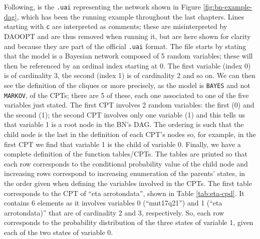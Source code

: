 Following, is the \texttt{.uai} representing the network shown in Figure \ref{fig:bn-example-dag}, which has been the running example throughout the last chapters.
Lines starting with \texttt{c} are interpreted as comments; these are misinterpreted by DAOOPT and are thus removed when running it, but are here shown for clarity and because they are part of the official \texttt{.uai} format.
The file starts by stating that the model is a Bayesian network composed of 5 random variables; these will then be referenced by an ordinal index starting at 0.
The first variable (index 0) is of cardinality 3, the second (index 1) is of cardinality 2 and so on.
We can then see the definition of the cliques or more precisely, as the model is \texttt{BAYES}  and not \texttt{MARKOV}, of the CPTs; there are 5 of these, each one associated to one of the five variables just stated.
The first CPT involves 2 random variables: the first (0) and the second (1); the second CPT involves only one variable (1) and this tells us that variable 1 is a root node in the BN's DAG.
The ordering is such that the child node is the last in the definition of each CPT's nodes so, for example, in the first CPT we find that variable 1 is the child of variable 0.
Finally, we have a complete definition of the function tables/CPTs.
The tables are printed so that each row corresponds to the conditional probability value of the child node and increasing rows correspond to increasing enumeration of the parents' states, in the order given when defining the variables involved in the CPTs.
The first table corresponds to the CPT of \enquote{eta arrotondata}, shown in Table \ref{tab:eta-cpd}.
It contains 6 elements as it involves variables 0 (\enquote{mut17q21}) and 1 (\enquote{eta arrotondata)} that are of cardinality 2 and 3, respectively.
So, each row corresponds to the probability distribution of the three states of variable 1, given each of the two states of variable 0.

